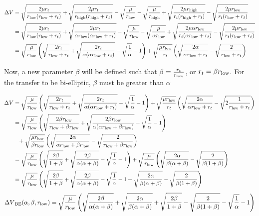 \documentclass[../basicOrbitalDynamics.tex]{subfiles}
\begin{document}
\begin{align*}
    \Delta V &= \sqrt{\frac{2\mu r_t}{{r}_\text{low}({r}_\text{low}+r_t)}}+\sqrt{\frac{2\mu r_t}{{r}_\text{high}({r}_\text{high}+r_t)}}-\sqrt{\frac{\mu}{{r}_\text{low}}}-\sqrt{\frac{\mu}{{r}_\text{high}}}+\sqrt{\frac{2\mu {r}_\text{high}}{r_t({r}_\text{high}+r_t)}}-\sqrt{\frac{2\mu {r}_\text{low}}{r_t({r}_\text{low}+r_t)}}\\
    &= \sqrt{\frac{2\mu r_t}{{r}_\text{low}({r}_\text{low}+r_t)}}+\sqrt{\frac{2\mu r_t}{\alpha {r}_\text{low}(\alpha {r}_\text{low}+r_t)}}-\sqrt{\frac{\mu}{{r}_\text{low}}}-\sqrt{\frac{\mu}{\alpha {r}_\text{low}}}+\sqrt{\frac{2\mu \alpha {r}_\text{low}}{r_t(\alpha {r}_\text{low}+r_t)}}-\sqrt{\frac{2\mu {r}_\text{low}}{r_t({r}_\text{low}+r_t)}} \\
    &= \sqrt{\frac{\mu}{{r}_\text{low}}}\left(\sqrt{\frac{2r_t}{{r}_\text{low}+r_t}}+\sqrt{\frac{2r_t}{\alpha(\alpha {r}_\text{low}+r_t)}}-\sqrt{\frac{1}{\alpha}}-1\right)+\sqrt{\frac{\mu {r}_\text{low}}{r_t}}\left(\sqrt{\frac{2\alpha}{\alpha {r}_\text{low}+r_t}}-\sqrt{\frac{2}{{r}_\text{low}+r_t}}\right) \\
\end{align*}

Now, a new parameter $\beta$ will be defined such that $\beta=\frac{r_t}{{r}_\text{low}}$, or $r_t=\beta {r}_\text{low}$. For the transfer to be bi-elliptic, $\beta$ must be greater than $\alpha$

\begin{align*}
    \Delta V &= \sqrt{\frac{\mu}{{r}_\text{low}}}\left(\sqrt{\frac{2r_t}{{r}_\text{low}+r_t}}+\sqrt{\frac{2r_t}{\alpha(\alpha {r}_\text{low}+r_t)}}-\sqrt{\frac{1}{\alpha}}-1\right)+\sqrt{\frac{\mu {r}_\text{low}}{r_t}}\left(\sqrt{\frac{2\alpha}{\alpha {r}_\text{low}+r_t}}-\sqrt{2\frac{1}{{r}_\text{low}+r_t}}\right) \\
    &=\sqrt{\frac{\mu}{{r}_\text{low}}}\left(\sqrt{\frac{2\beta {r}_\text{low}}{{r}_\text{low}+\beta {r}_\text{low}}}+\sqrt{\frac{2\beta {r}_\text{low}}{\alpha(\alpha {r}_\text{low}+\beta {r}_\text{low})}}-\sqrt{\frac{1}{\alpha}}-1\right)\\
    &\phantom{=}+\sqrt{\frac{\mu {r}_\text{low}}{\beta {r}_\text{low}}}\left(\sqrt{\frac{2\alpha}{\alpha {r}_\text{low}+\beta{r}_\text{low}}}-\sqrt{\frac{2}{{r}_\text{low}+\beta {r}_\text{low}}}\right) \\
    &=\sqrt{\frac{\mu}{{r}_\text{low}}}\left(\sqrt{\frac{2\beta}{1+\beta}}+\sqrt{\frac{2\beta}{\alpha(\alpha+\beta)}}-\sqrt{\frac{1}{\alpha}}-1\right)+\sqrt{\frac{\mu}{{r}_\text{low}}}\left(\sqrt{\frac{2\alpha}{\beta(\alpha+\beta)}}-\sqrt{\frac{2}{\beta(1+\beta)}}\right) \\
    &=\sqrt{\frac{\mu}{{r}_\text{low}}}\left(\sqrt{\frac{2\beta}{1+\beta}}+\sqrt{\frac{2\beta}{\alpha(\alpha+\beta)}}-\sqrt{\frac{1}{\alpha}}-1+\sqrt{\frac{2\alpha}{\beta(\alpha+\beta)}}-\sqrt{\frac{2}{\beta(1+\beta)}}\right)
\end{align*}
\begin{equation}\label{Bi-Elliptic DeltaV in terms of alpha, beta, r1}
    {\Delta V}_\text{BE}(\alpha,\beta,{r}_\text{low}) = \sqrt{\frac{\mu}{{r}_\text{low}}}\left(\sqrt{\frac{2\beta}{\alpha(\alpha+\beta)}}+\sqrt{\frac{2\alpha}{\beta(\alpha+\beta)}}+\sqrt{\frac{2\beta}{1+\beta}}-\sqrt{\frac{2}{\beta(1+\beta)}}-\sqrt{\frac{1}{\alpha}}-1\right)
\end{equation}
\end{document}
